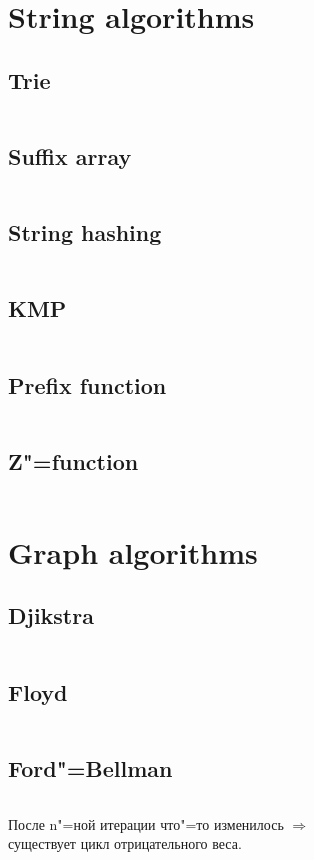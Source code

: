 ﻿\documentclass[10pt,twocolumn,oneside]{article}
\begin{document}
\section{String algorithms}
\subsection{Trie}
\inputminted[breaklines]{cpp}{String algorithms/trie.cpp}
\subsection{Suffix array}
\inputminted[breaklines]{cpp}{String algorithms/suffix array.cpp}
\subsection{String hashing}
\inputminted[breaklines]{cpp}{String algorithms/string hashing.cpp}
\subsection{KMP}
\inputminted[breaklines]{python}{String algorithms/kmp.py}
\subsection{Prefix function}
\inputminted[breaklines]{python}{String algorithms/prefix-function.py}
\subsection{Z"=function}
\inputminted[breaklines]{python}{String algorithms/z-function.py}

\section{Graph algorithms}
\subsection{Djikstra}
\inputminted[breaklines]{cpp}{Graph algorithms/djikstra.cpp}
\subsection{Floyd}
\inputminted[breaklines]{cpp}{Graph algorithms/floyd.cpp}
\subsection{Ford"=Bellman}
\inputminted[breaklines]{python}{Graph algorithms/ford-bellman.py}
После n"=ной итерации что"=то изменилось $\Rightarrow$ \\
существует цикл отрицательного веса.
\end{document}
